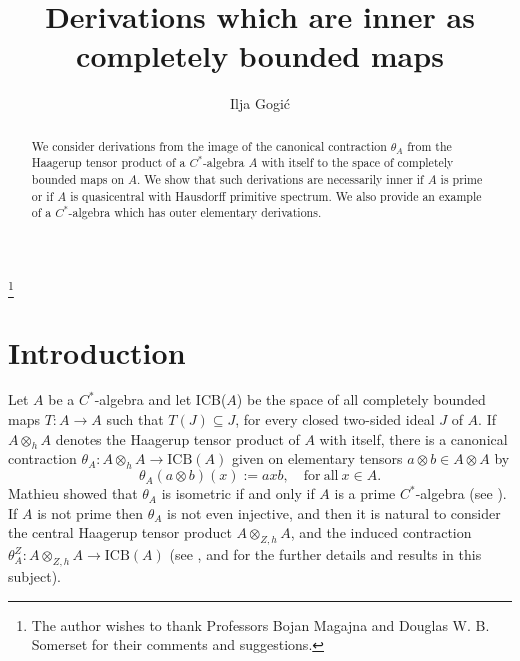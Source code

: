 \documentclass[]{amsart}
\theoremstyle{remark}
\theoremstyle{definition}
\theoremstyle{question}
\numberwithin{equation}{section}
\begin{document}
\title[]{Derivations which are inner as completely bounded maps}
\author{Ilja Gogi\'c}
\address{Department of Mathematics\\ University of Zagreb\\
Bijeni\v{c}ka cesta 30\\ Zagreb 10000\\ Croatia}

\thanks{The author wishes to thank Professors Bojan Magajna and Douglas W. B.
Somerset for their comments and suggestions.}


\begin{abstract} We consider derivations from the image of the canonical
contraction $\theta_A$ from the Haagerup tensor product of a $C^*$-algebra $A$
with itself to the space of completely bounded maps on $A$. We show that such
derivations are necessarily inner if $A$ is prime  or if $A$ is
quasicentral with Hausdorff primitive spectrum. We also provide an
example of a $C^*$-algebra which has outer elementary derivations.
\end{abstract}

\maketitle

\section{Introduction}

Let $A$ be a $C^*$-algebra and let ICB($A$) be the space of all completely
bounded maps $T: A \to A$ such that $T(J) \subseteq J$, for every closed
two-sided ideal $J$ of $A$. If $A \otimes_h A$ denotes the Haagerup tensor
product of $A$ with itself, there is a canonical contraction $\theta_A : A
\otimes_h A \to \mathrm{ICB}(A)$ given on elementary tensors $a \otimes b \in A
\otimes A$ by
$$\theta_A(a \otimes b)(x):=axb, \quad \mathrm{for} \ \mathrm{all} \ x \in A.$$
Mathieu showed that $\theta_A$ is isometric if and only if $A$ is a prime
$C^*$-algebra (see \cite[5.4.11]{Ara}).
If $A$ is not prime then $\theta_A$ is not even injective, and then it is natural
to consider the central Haagerup tensor product
$A \otimes_{Z,h}A$, and the induced contraction $\theta^Z_{A} : A \otimes_{Z,h} A
\to \mathrm{ICB}(A)$ (see \cite{Som2}, \cite{AST} and \cite{AST1} for the
further details and results in this subject).
\end{document}

